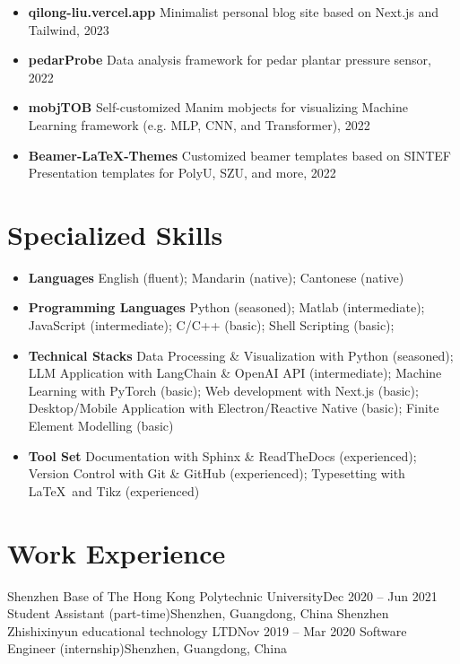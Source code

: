 \documentclass[letterpaper,11pt]{article}
\begin{document}
    \begin{itemize}[leftmargin=0.15in, label={}, itemsep=0em]
        \item \textbf{qilong-liu.vercel.app}
        Minimalist personal blog site based on Next.js and Tailwind, 2023
        \item \textbf{pedarProbe}
        Data analysis framework for pedar plantar pressure sensor, 2022
        \item \textbf{mobjTOB}
        Self-customized Manim mobjects for visualizing Machine Learning framework (e.g. MLP, CNN, and Transformer), 2022
        \item \textbf{Beamer-LaTeX-Themes}
        Customized beamer templates based on SINTEF Presentation templates for PolyU, SZU, and more, 2022
    \end{itemize}

    \section{Specialized Skills}

    \begin{itemize}[leftmargin=0.15in, label={}, itemsep=0em]
        \item \textbf{Languages}
        English (fluent); Mandarin (native); Cantonese (native)
        \item \textbf{Programming Languages}
        Python (seasoned); Matlab (intermediate); JavaScript (intermediate); C/C++ (basic); Shell Scripting (basic);
        \item \textbf{Technical Stacks}
        Data Processing \& Visualization with Python (seasoned); LLM Application with LangChain \& OpenAI API (intermediate); Machine Learning with PyTorch (basic); Web development with Next.js (basic); Desktop/Mobile Application with Electron/Reactive Native (basic); Finite Element Modelling (basic)
        \item \textbf{Tool Set}
        Documentation with Sphinx \& ReadTheDocs (experienced); Version Control with Git \& GitHub (experienced); Typesetting with \LaTeX\ and Tikz (experienced)
    \end{itemize}

    \section{Work Experience}

    \resumeSubHeadingListStart
        \resumeSubheading
            {Shenzhen Base of The Hong Kong Polytechnic University}{Dec 2020 -- Jun 2021}
            {Student Assistant (part-time)}{Shenzhen, Guangdong, China}
        \resumeSubheading
            {Shenzhen Zhishixinyun educational technology LTD}{Nov 2019 -- Mar 2020}
            {Software Engineer (internship)}{Shenzhen, Guangdong, China}
    \resumeSubHeadingListEnd
\end{document}
